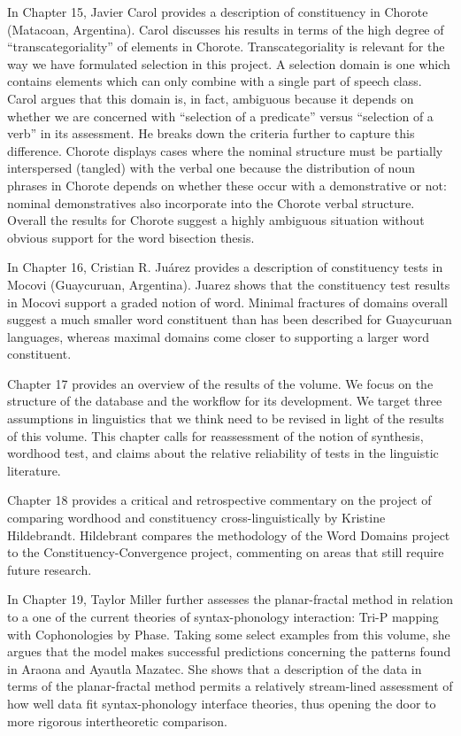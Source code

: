 \documentclass[output=paper,hidelinks]{langscibook}
\begin{document}
In Chapter 15, Javier Carol provides a description of constituency in Chorote (Matacoan, Argentina). Carol discusses his results in terms of the high degree of ``transcategoriality'' of elements in Chorote. Transcategoriality is relevant for the way we have formulated selection in this project. A selection domain is one which contains elements which can only combine with a single part of speech class. Carol argues that this domain is, in fact, ambiguous because it depends on whether we are concerned with ``selection of a predicate'' versus ``selection of a verb'' in its assessment. He breaks down the criteria further to capture this difference. Chorote displays cases where the nominal structure must be partially interspersed (tangled) with the verbal one because the distribution of noun phrases in Chorote depends on whether these occur with a demonstrative or not: nominal demonstratives also incorporate into the Chorote verbal structure. Overall the results for Chorote suggest a highly ambiguous situation without obvious support for the word bisection thesis.

\hspace*{-2.3pt}In Chapter 16, Cristian R. Juárez provides a description of constituency tests in Mocovi (Guaycuruan, Argentina). Juarez shows that the constituency test results in Mocovi support a graded notion of word. Minimal fractures of domains overall suggest a much smaller word constituent than has been described for Guaycuruan languages, whereas maximal domains come closer to supporting a larger word constituent.

Chapter 17 provides an overview of the results of the volume. We focus on the structure of the database and the workflow for its development. We target three assumptions in linguistics that we think need to be revised in light of the results of this volume. This chapter calls for reassessment of the notion of synthesis, wordhood test, and claims about the relative reliability of tests in the linguistic literature.

Chapter 18 provides a critical and retrospective commentary on the project of comparing wordhood and constituency cross-linguistically by Kristine Hildebrandt. Hildebrant compares the methodology of the Word Domains project to the Constituency-Convergence project, commenting on areas that still require future research.

In Chapter 19, Taylor Miller further assesses the planar-fractal method in relation to a one of the current theories of syntax-phonology interaction: Tri-P mapping with Cophonologies by Phase. Taking some select examples from this volume, she argues that the model makes successful predictions concerning the patterns found in Araona and Ayautla Mazatec. She shows that a description of the data in terms of the planar-fractal method permits a relatively stream-lined assessment of how well data fit syntax-phonology interface theories, thus opening the door to more rigorous intertheoretic comparison. 


\printglossary



{\sloppy\printbibliography[heading=subbibliography,notkeyword=this]}
\end{document}
